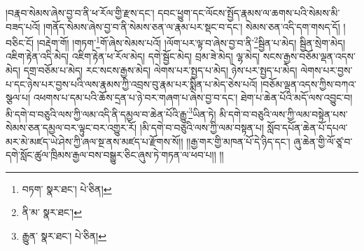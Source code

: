 །བརྣབ་སེམས་ཞེས་བྱ་བ་ནི་ཕ་རོལ་གྱི་རྫས་དང་། དབང་ཕྱུག་དང་ལོངས་སྤྱོད་རྣམས་ལ་ཆགས་པའི་སེམས་མི་བཟད་པའོ། །གནོད་སེམས་ཞེས་བྱ་བ་ནི་སེམས་ཅན་ལ་རྣམ་པར་སྡང་བ་དང་། སེམས་ཅན་འདི་དག་གསད་དོ། །བཅིང་ངོ། །བརྡེག་གོ། །གཏག་\footnote{བཏག་  སྣར་ཐང་།  པེ་ཅིན། }གོ་ཞེས་སེམས་པའོ། །ལོག་པར་ལྟ་བ་ཞེས་བྱ་བ་ནི་\footnote{ནི་མ་  སྣར་ཐང་། }སྦྱིན་པ་མེད། སྦྱིན་སྲེག་མེད། འཇིག་རྟེན་འདི་མེད། འཇིག་རྟེན་ཕ་རོལ་མེད། དགེ་སྦྱོང་མེད། བྲམ་ཟེ་མེད། ལྷ་མེད། སངས་རྒྱས་བཅོམ་ལྡན་འདས་མེད། དགྲ་བཅོམ་པ་མེད། རང་སངས་རྒྱས་མེད། ལེགས་པར་སྤྱད་པ་མེད། ཉེས་པར་སྤྱད་པ་མེད། ལེགས་པར་བྱས་པ་དང་ཉེས་པར་བྱས་པའི་ལས་རྣམས་ཀྱི་འབྲས་བུ་རྣམ་པར་སྨིན་པ་མེད་ཅེས་པའོ། །བཅོམ་ལྡན་འདས་ཀྱིས་བཀའ་སྩལ་པ། འཕགས་པ་དམ་པའི་ཆོས་དྲན་པ་ཉེ་བར་གཞག་པ་ཞེས་བྱ་བ་དང་། ཐེག་པ་ཆེན་པོའི་མདོ་ལས་འབྱུང་བ། མི་དགེ་བ་བཅུའི་ལས་ཀྱི་ལམ་འདི་ནི་དམྱལ་བ་ཆེན་པོའི་རྒྱུ་\footnote{རྒྱུན་  སྣར་ཐང་།  པེ་ཅིན། }ཡིན་ཏེ། མི་དགེ་བ་བཅུའི་ལས་ཀྱི་ལམ་བསྟེན་པས་སེམས་ཅན་དམྱལ་བར་ལྟུང་བར་འགྱུར་རོ། །མི་དགེ་བ་བཅུའི་ལས་ཀྱི་ལམ་བསྟན་པ། སློབ་དཔོན་ཆེན་པོ་དཔལ་མར་མེ་མཛད་ཡེ་ཤེས་ཀྱི་ཞལ་སྔ་ནས་མཛད་པ་རྫོགས་སོ།། །།རྒྱ་གར་གྱི་མཁན་པོ་དེ་ཉིད་དང་། ཞུ་ཆེན་གྱི་ལོ་ཙཱ་བ་དགེ་སློང་ཚུལ་ཁྲིམས་རྒྱལ་བས་བསྒྱུར་ཅིང་ཞུས་ཏེ་གཏན་ལ་ཕབ་པ།། །།